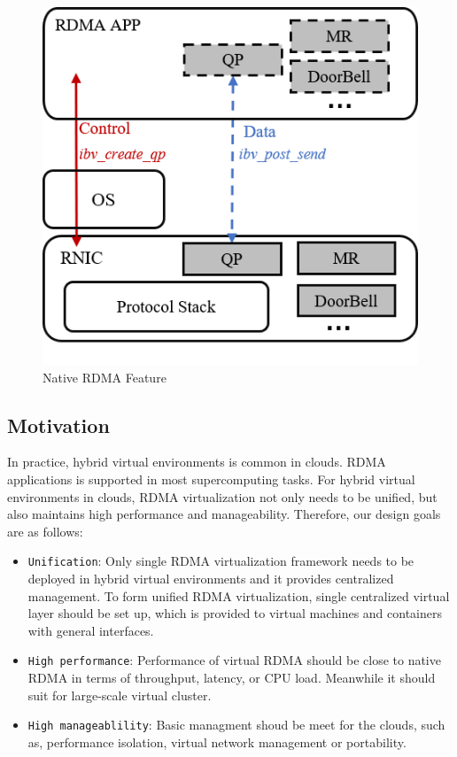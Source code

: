 \begin{figure}[!ht]
	\centering
	\includegraphics[width=0.6\linewidth]{images/rdma-feat.png}
	\caption{Native RDMA Feature}
	\label{fig:rdma-feat}
\end{figure}

\subsection{Motivation}
In practice, hybrid virtual environments is common in clouds. RDMA applications is supported in most supercomputing tasks. For hybrid virtual environments in clouds, RDMA virtualization not only needs to be unified, but also maintains high performance and manageability. Therefore, our design goals are as follows:

\begin{itemize}
\item {\verb|Unification|}: Only single RDMA virtualization framework needs to be deployed in hybrid virtual environments and it provides centralized management.
To form unified RDMA virtualization, single centralized virtual layer should be set up, which is provided to virtual machines and containers with general interfaces.
\item {\verb|High performance|}: Performance of virtual RDMA should be close to native RDMA in terms of throughput, latency, or CPU load. Meanwhile it should suit for large-scale virtual cluster.
\item {\verb|High manageablility|}: Basic managment shoud be meet for the clouds, such as, performance isolation, virtual network management or portability.
\end{itemize}
